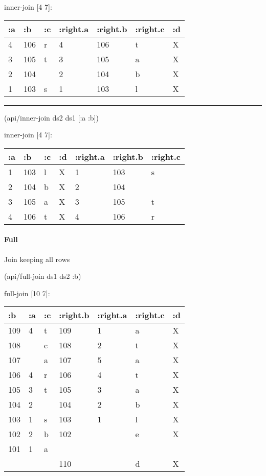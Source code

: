\documentclass[]{article}
\newenvironment{Shaded}{\begin{snugshade}}{\end{snugshade}}
\newcommand{\AttributeTok}[1]{\textcolor[rgb]{0.77,0.63,0.00}{#1}}
\newcommand{\NormalTok}[1]{#1}
\let\oldparagraph\paragraph
\renewcommand{\paragraph}[1]{\oldparagraph{#1}\mbox{}}
\begin{document}
inner-join {[}4 7{]}:

\begin{longtable}[]{@{}lllllll@{}}
\toprule
:a & :b & :c & :right.a & :right.b & :right.c & :d\tabularnewline
\midrule
\endhead
4 & 106 & r & 4 & 106 & t & X\tabularnewline
3 & 105 & t & 3 & 105 & a & X\tabularnewline
2 & 104 & & 2 & 104 & b & X\tabularnewline
1 & 103 & s & 1 & 103 & l & X\tabularnewline
\bottomrule
\end{longtable}

\begin{center}\rule{0.5\linewidth}{0.5pt}\end{center}

\begin{Shaded}
\begin{Highlighting}[]
\NormalTok{(api/inner-join ds2 ds1 [}\AttributeTok{:a} \AttributeTok{:b}\NormalTok{])}
\end{Highlighting}
\end{Shaded}

inner-join {[}4 7{]}:

\begin{longtable}[]{@{}lllllll@{}}
\toprule
:a & :b & :c & :d & :right.a & :right.b & :right.c\tabularnewline
\midrule
\endhead
1 & 103 & l & X & 1 & 103 & s\tabularnewline
2 & 104 & b & X & 2 & 104 &\tabularnewline
3 & 105 & a & X & 3 & 105 & t\tabularnewline
4 & 106 & t & X & 4 & 106 & r\tabularnewline
\bottomrule
\end{longtable}

\hypertarget{full}{%
\paragraph{Full}\label{full}}

Join keeping all rows

\begin{Shaded}
\begin{Highlighting}[]
\NormalTok{(api/full-join ds1 ds2 }\AttributeTok{:b}\NormalTok{)}
\end{Highlighting}
\end{Shaded}

full-join {[}10 7{]}:

\begin{longtable}[]{@{}lllllll@{}}
\toprule
:b & :a & :c & :right.b & :right.a & :right.c & :d\tabularnewline
\midrule
\endhead
109 & 4 & t & 109 & 1 & a & X\tabularnewline
108 & & c & 108 & 2 & t & X\tabularnewline
107 & & a & 107 & 5 & a & X\tabularnewline
106 & 4 & r & 106 & 4 & t & X\tabularnewline
105 & 3 & t & 105 & 3 & a & X\tabularnewline
104 & 2 & & 104 & 2 & b & X\tabularnewline
103 & 1 & s & 103 & 1 & l & X\tabularnewline
102 & 2 & b & 102 & & e & X\tabularnewline
101 & 1 & a & & & &\tabularnewline
& & & 110 & & d & X\tabularnewline
\bottomrule
\end{longtable}
\end{document}
